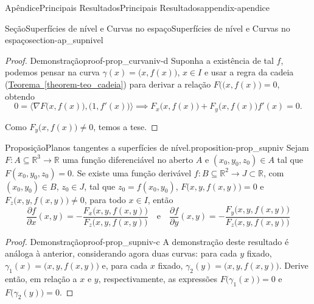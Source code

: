 \documentclass[oneside,10pt,]{book}
\newcommand{\xreffont}{\relax}
\numberwithin{equation}{section}
\newcommand{\R}{\mathbb R}
\begin{document}
\begin{appendixptx}{Apêndice}{Principais Resultados}{}{Principais Resultados}{}{}{appendix-apendice}
\begin{sectionptx}{Seção}{Superfícies de nível e Curvas no espaço}{}{Superfícies de nível e Curvas no espaço}{}{}{section-ap_supnivel}
\begin{proof}{Demonstração}{}{proof-prop_curvaniv-d}
Suponha a existência de tal \(f\), podemos pensar na curva \(\gamma(x)=\big(x,f(x)\big)\), \(x\in I\) e usar a regra da cadeia (\hyperref[theorem-teo_cadeia]{Teorema~{\xreffont\ref{theorem-teo_cadeia}}}) para derivar a relação \(F(\big(x,f(x)\big)=0\), obtendo%
\begin{equation*}
0=\Big\langle\nabla
F\big(x,f(x)\big),\big(1,f'(x)\big)\Big\rangle\implies
F_x\big(x,f(x)\big)+F_y\big(x,f(x)\big)f'(x)=0.
\end{equation*}
%
\par
Como \(F_y\big(x,f(x)\big)\neq0\), temos a tese.%
\end{proof}
\begin{proposition}{Proposição}{Planos tangentes a superfícies de nível.}{}{proposition-prop_supniv}%
Sejam \(F\colon A\subseteq\R^3\to\R\) uma função diferenciável no aberto \(A\) e \((x_0,y_0,z_0)\in A\) tal que \(F(x_0,y_0,z_0)=0\). Se existe uma função derivável \(f\colon
B\subseteq\R^2\to J\subset\R\), com \((x_0,y_0)\in B\), \(z_0\in
J\), tal que \(z_0=f(x_0,y_0)\), \(F\big(x,y,f(x,y)\big)=0\) e \(F_z\big(x,y,f(x,y)\big)\neq 0\), para todo \(x\in I\), então%
\begin{equation*}
\dfrac{\partial f}{\partial
x}(x,y)=-\dfrac{F_x\big(x,y,f(x,y))}{F_z\big(x,y,f(x,y)\big)}\quad\text{e}\quad\dfrac{\partial
f}{\partial
y}(x,y)=-\dfrac{F_y\big(x,y,f(x,y))}{F_z\big(x,y,f(x,y)\big)}
\end{equation*}
\end{proposition}
\begin{proof}{Demonstração}{}{proof-prop_supniv-c}
A demonstração deste resultado é análoga à anterior, considerando agora duas curvas: para cada \(y\) fixado, \(\gamma_1(x)=\big(x,y,f(x,y)\big)\) e, para cada \(x\) fixado, \(\gamma_2(y)=\big(x,y,f(x,y)\big)\). Derive então, em relação a \(x\) e \(y\), respectivamente, as expressões \(F\big(\gamma_1(x)\big)=0\) e \(F\big(\gamma_2(y)\big)=0\).%
\end{proof}
\end{sectionptx}
\end{appendixptx}
\end{document}
